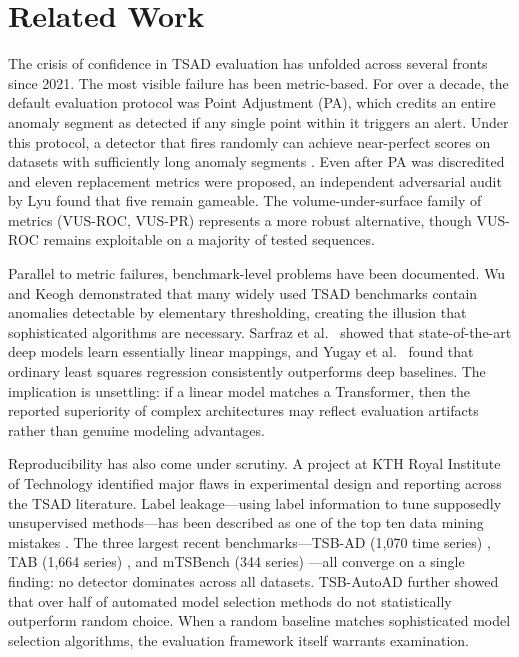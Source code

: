\documentclass[preprint,12pt]{elsarticle}
\begin{document}
\section{Related Work}
\label{sec:related}

The crisis of confidence in TSAD evaluation has unfolded across several fronts since 2021. The most visible failure has been metric-based. For over a decade, the default evaluation protocol was Point Adjustment (PA), which credits an entire anomaly segment as detected if any single point within it triggers an alert. Under this protocol, a detector that fires randomly can achieve near-perfect scores on datasets with sufficiently long anomaly segments \cite{kim2022towards}. Even after PA was discredited and eleven replacement metrics were proposed, an independent adversarial audit by Lyu \cite{lyu2025didwe} found that five remain gameable. The volume-under-surface family of metrics (VUS-ROC, VUS-PR) represents a more robust alternative, though VUS-ROC remains exploitable on a majority of tested sequences.

Parallel to metric failures, benchmark-level problems have been documented. Wu and Keogh \cite{wu2021current} demonstrated that many widely used TSAD benchmarks contain anomalies detectable by elementary thresholding, creating the illusion that sophisticated algorithms are necessary. Sarfraz et al.\ \cite{sarfraz2024position} showed that state-of-the-art deep models learn essentially linear mappings, and Yugay et al.\ \cite{yugay2025strong} found that ordinary least squares regression consistently outperforms deep baselines. The implication is unsettling: if a linear model matches a Transformer, then the reported superiority of complex architectures may reflect evaluation artifacts rather than genuine modeling advantages.

Reproducibility has also come under scrutiny. A project at KTH Royal Institute of Technology \cite{xu2025trustworthiness} identified major flaws in experimental design and reporting across the TSAD literature. Label leakage---using label information to tune supposedly unsupervised methods---has been described as one of the top ten data mining mistakes \cite{data_mining_mistakes}. The three largest recent benchmarks---TSB-AD (1,070 time series) \cite{liu2024elephant}, TAB (1,664 series) \cite{qiu2025tab}, and mTSBench (344 series) \cite{mtsbench2026}---all converge on a single finding: no detector dominates across all datasets. TSB-AutoAD \cite{tsbautoad2025} further showed that over half of automated model selection methods do not statistically outperform random choice. When a random baseline matches sophisticated model selection algorithms, the evaluation framework itself warrants examination.
\end{document}
